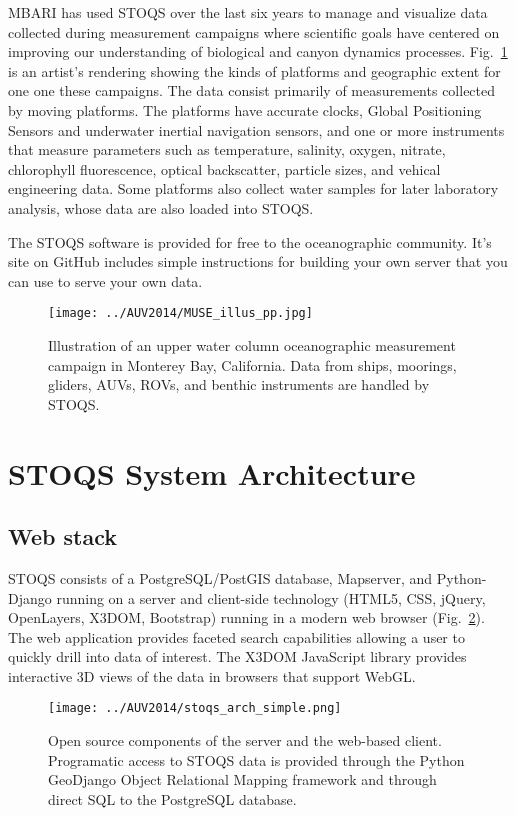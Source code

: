 \documentclass[conference]{IEEEtran}
\begin{document}
MBARI has used STOQS over the last six years to manage and visualize data collected 
during measurement campaigns where scientific goals have centered on improving 
our understanding of biological and canyon dynamics processes. Fig.~\ref{fig:MUSE_illus_pp} 
is an artist's rendering showing the kinds of platforms and geographic extent for one one 
these campaigns.  The data consist primarily of measurements 
collected by moving platforms. The platforms have accurate clocks, Global Positioning 
Sensors and underwater inertial navigation sensors, and one or more instruments that measure 
parameters such as temperature, salinity, oxygen, nitrate, chlorophyll fluorescence, 
optical backscatter, particle sizes, and vehical engineering data. Some platforms also collect
water samples for later laboratory analysis, whose data are also loaded into STOQS. 

The STOQS software is provided for free to the oceanographic community. It's site on
GitHub \cite{stoqs_github} includes simple instructions for building your own server that
you can use to serve your own data.

\begin{figure}[htbp]
\centering
\texttt{[image: ../AUV2014/MUSE\_illus\_pp.jpg]}
\caption{Illustration of an upper water column oceanographic measurement campaign in Monterey Bay, California. 
Data from ships, moorings, gliders, AUVs, ROVs, and benthic instruments are handled by STOQS.}
\label{fig:MUSE_illus_pp}
\end{figure}

\section{STOQS System Architecture}

\subsection{Web stack}

STOQS consists of a PostgreSQL/PostGIS database, Mapserver, and Python-Django 
running on a server and client-side technology (HTML5, CSS, jQuery, OpenLayers, 
X3DOM, Bootstrap) running in a modern web browser (Fig.~\ref{fig:STOQSArch}). 
The web application provides faceted search capabilities allowing a user to quickly 
drill into data of interest. The X3DOM JavaScript library provides interactive 
3D views of the data in browsers that support WebGL.  

\begin{figure}[htbp]
\centering
\texttt{[image: ../AUV2014/stoqs\_arch\_simple.png]}
\caption{Open source components of the server and the web-based client. Programatic access to 
STOQS data is provided through the Python GeoDjango Object Relational Mapping framework 
and through direct SQL to the PostgreSQL database.}
\label{fig:STOQSArch}
\end{figure}
\end{document}
